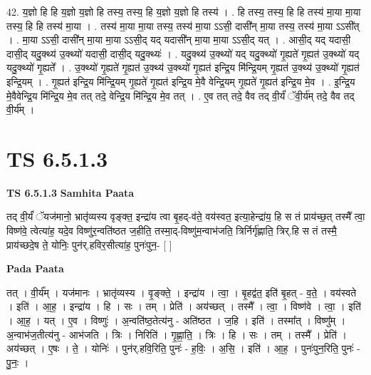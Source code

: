 \documentclass[17pt]{extarticle}
\begin{document}
42. य॒ज्ञो हि हि य॒ज्ञो य॒ज्ञो हि तस्य॒ तस्य॒ हि य॒ज्ञो य॒ज्ञो हि तस्य॑ । . हि तस्य॒ तस्य॒ हि हि तस्य॑ मा॒या मा॒या तस्य॒ हि हि तस्य॑ मा॒या । . तस्य॑ मा॒या मा॒या तस्य॒ तस्य॑ मा॒या ऽऽसी॒ दासी᳚न् मा॒या तस्य॒ तस्य॑ मा॒या ऽऽसी᳚त् । . मा॒या ऽऽसी॒ दासी᳚न् मा॒या मा॒या ऽऽसी॒द् यद् यदासी᳚न् मा॒या मा॒या ऽऽसी॒द् यत् । . आसी॒द् यद् यदासी॒ दासी॒द् यदु॒क्थ्य॑ उ॒क्थ्यो॑ यदासी॒ दासी॒द् यदु॒क्थ्यः॑ । . यदु॒क्थ्य॑ उ॒क्थ्यो॑ यद् यदु॒क्थ्यो॑ गृ॒ह्यते॑ गृ॒ह्यत॑ उ॒क्थ्यो॑ यद् यदु॒क्थ्यो॑ गृ॒ह्यते᳚ । . उ॒क्थ्यो॑ गृ॒ह्यते॑ गृ॒ह्यत॑ उ॒क्थ्य॑ उ॒क्थ्यो॑ गृ॒ह्यत॑ इन्द्रि॒य मि॑न्द्रि॒यम् गृ॒ह्यत॑ उ॒क्थ्य॑ उ॒क्थ्यो॑ गृ॒ह्यत॑ इन्द्रि॒यम् । . गृ॒ह्यत॑ इन्द्रि॒य मि॑न्द्रि॒यम् गृ॒ह्यते॑ गृ॒ह्यत॑ इन्द्रि॒य मे॒वै वेन्द्रि॒यम् गृ॒ह्यते॑ गृ॒ह्यत॑ इन्द्रि॒य मे॒व । . इ॒न्द्रि॒य मे॒वैवेन्द्रि॒य मि॑न्द्रि॒य मे॒व तत् तदे॒ वेन्द्रि॒य मि॑न्द्रि॒य मे॒व तत् । . ए॒व तत् तदे॒ वैव तद् वी॒र्यं॑ ॅवी॒र्य॑म् तदे॒ वैव तद् वी॒र्य᳚म् । \newline
\pagebreak
{}

\section{ TS 6.5.1.3 }

\textbf{TS 6.5.1.3 } \newline
\textbf{Samhita Paata} \newline

तद् वी॒र्यं॑ ॅयज॑मानो॒ भ्रातृ॑व्यस्य वृङ्क्त॒ इन्द्रा॑य त्वा बृ॒हद्-व॑ते॒ वय॑स्वत॒ इत्या॒हेन्द्रा॑य॒ हि स तं प्राय॑च्छ॒त् तस्मै᳚ त्वा॒ विष्ण॑वे॒ त्वेत्या॑ह॒ यदे॒व विष्णु॑र॒न्वति॑ष्ठत ज॒हीति॒ तस्मा॒द्-विष्णु॑म॒न्वाभ॑जति॒ त्रिर्निर्गृ॑ह्णाति॒ त्रिर्.हि स तं तस्मै॒ प्राय॑च्छदे॒ष ते॒ योनिः॒ पुन॑र्.हविर॒सीत्या॑ह॒ पुनः॑पुन॒- [  ] \newline

\textbf{Pada Paata} \newline

तत् । वी॒र्य᳚म् । यज॑मानः । भ्रातृ॑व्यस्य । वृ॒ङ्क्ते॒ । इन्द्रा॑य । त्वा॒ । बृ॒हद्व॑त॒ इति॑ बृ॒हत् - व॒ते॒ । वय॑स्वते । इति॑ । आ॒ह॒ । इन्द्रा॑य । हि । सः । तम् । प्रेति॑ । अय॑च्छत् । तस्मै᳚ । त्वा॒ । विष्ण॑वे । त्वा॒ । इति॑ । आ॒ह॒ । यत् । ए॒व । विष्णुः॑ । अ॒न्वति॑ष्ठ॒तेत्य॑नु - अति॑ष्ठत । ज॒हि । इति॑ । तस्मा᳚त् । विष्णु᳚म् । अ॒न्वाभ॑ज॒तीत्य॑नु - आभ॑जति । त्रिः । निरिति॑ । गृ॒ह्णा॒ति॒ । त्रिः । हि । सः । तम् । तस्मै᳚ । प्रेति॑ । अय॑च्छत् । ए॒षः । ते॒ । योनिः॑ । पुन॑र्.हवि॒रिति॒ पुनः॑ - ह॒विः॒ । अ॒सि॒ । इति॑ । आ॒ह॒ । पुनः॑पुन॒रिति॒ पुनः॑ - पु॒नः॒ ।  \newline
\end{document}
